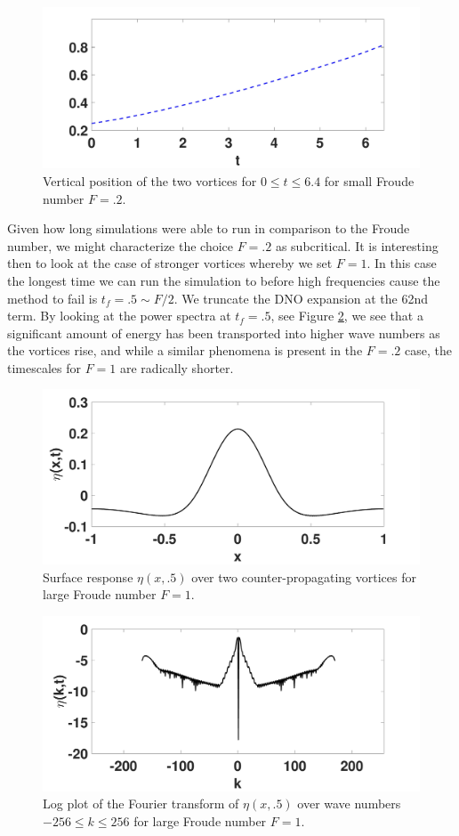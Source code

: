 \documentclass[a4paper,11pt]{article}
\begin{document}
\begin{figure}[!h]
\centering
\includegraphics[width=.75\textwidth]{ztrack_mu_pt2_F_pt2_tf_6pt4}
\caption{Vertical position of the two vortices for $0\leq t \leq 6.4$ for small Froude number $F=.2$.}
\end{figure}

Given how long simulations were able to run in comparison to the Froude number, we might characterize the choice $F=.2$ as subcritical.  It is interesting then to look at the case of stronger vortices whereby we set $F=1$.  In this case the longest time we can run the simulation to before high frequencies cause the method to fail is $t_{f} = .5 \sim F/2$.  We truncate the DNO expansion at the 62nd term.  By looking at the power spectra at $t_{f}=.5$, see Figure \ref{fig:pspecF1}, we see that a significant amount of energy has been transported into higher wave numbers as the vortices rise, and while a similar phenomena is present in the $F=.2$ case, the timescales for $F=1$ are radically shorter.  
\begin{figure}[!h]
\centering
\includegraphics[width=.75\textwidth]{surf_resp_mu_pt2_F_1_tf_pt5}
\caption{Surface response $\eta(x,.5)$ over two counter-propagating vortices for large Froude number $F=1$.}
\label{fig:surfrepF1}
\end{figure}
\begin{figure}[!h]
\centering
\includegraphics[width=.75\textwidth]{pspec_mu_pt2_F_1_tf_pt5}
\caption{Log plot of the Fourier transform of $\eta(x,.5)$ over wave numbers $-256\leq k \leq 256$ for large Froude number $F=1$.}
\label{fig:pspecF1}
\end{figure}
\end{document}
